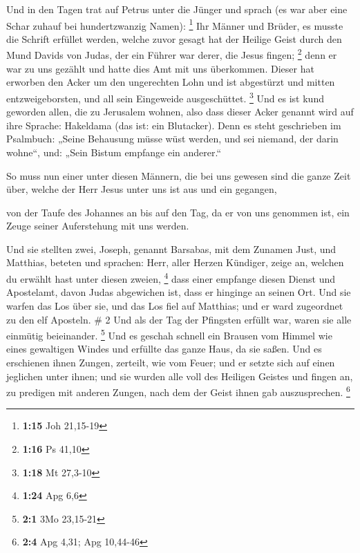  Und in den Tagen trat auf Petrus unter die Jünger und
sprach (es war aber eine Schar zuhauf bei hundertzwanzig Namen):
\footnote{\textbf{1:15} Joh 21,15-19}  Ihr Männer und
Brüder, es musste die Schrift erfüllet werden, welche zuvor gesagt hat
der Heilige Geist durch den Mund Davids von Judas, der ein Führer war
derer, die Jesus fingen; \footnote{\textbf{1:16} Ps 41,10}
 denn er war zu uns gezählt und hatte dies Amt mit uns
überkommen.  Dieser hat erworben den Acker um den
ungerechten Lohn und ist abgestürzt und mitten entzweigeborsten, und all
sein Eingeweide ausgeschüttet. \footnote{\textbf{1:18} Mt 27,3-10}
 Und es ist kund geworden allen, die zu Jerusalem wohnen,
also dass dieser Acker genannt wird auf ihre Sprache: Hakeldama (das
ist: ein Blutacker).  Denn es steht geschrieben im
Psalmbuch: „Seine Behausung müsse wüst werden, und sei niemand, der
darin wohne``, und: „Sein Bistum empfange ein anderer.``

 So muss nun einer unter diesen Männern, die bei uns
gewesen sind die ganze Zeit über, welche der Herr Jesus unter uns ist
aus und ein gegangen,

 von der Taufe des Johannes an bis auf den Tag, da er von
uns genommen ist, ein Zeuge seiner Auferstehung mit uns werden.

 Und sie stellten zwei, Joseph, genannt Barsabas, mit dem
Zunamen Just, und Matthias,  beteten und sprachen: Herr,
aller Herzen Kündiger, zeige an, welchen du erwählt hast unter diesen
zweien, \footnote{\textbf{1:24} Apg 6,6}  dass einer
empfange diesen Dienst und Apostelamt, davon Judas abgewichen ist, dass
er hinginge an seinen Ort.  Und sie warfen das Los über
sie, und das Los fiel auf Matthias; und er ward zugeordnet zu den elf
Aposteln. \# 2  Und als der Tag der Pfingsten erfüllt war,
waren sie alle einmütig beieinander. \footnote{\textbf{2:1} 3Mo 23,15-21}
 Und es geschah schnell ein Brausen vom Himmel wie eines
gewaltigen Windes und erfüllte das ganze Haus, da sie saßen.
 Und es erschienen ihnen Zungen, zerteilt, wie vom Feuer;
und er setzte sich auf einen jeglichen unter ihnen;  und
sie wurden alle voll des Heiligen Geistes und fingen an, zu predigen mit
anderen Zungen, nach dem der Geist ihnen gab auszusprechen. \footnote{\textbf{2:4}
  Apg 4,31; Apg 10,44-46}

